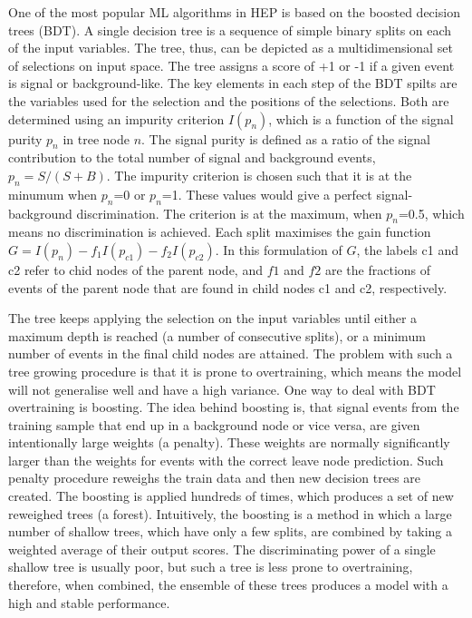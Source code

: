 One of the most popular ML algorithms in HEP is based on the boosted decision trees (BDT). A single decision tree is a sequence of simple binary splits on each of the input variables. The tree, thus, can be depicted as a multidimensional set of selections on input space. The tree assigns a score of +1 or -1 if a given event is signal or background-like. The key elements in each step of the BDT spilts are the variables used for the selection and the positions of the selections. Both are determined using an impurity criterion $I(p_n)$, which is a function of the signal purity $p_n$ in tree node $n$. The signal purity is defined as a ratio of the signal contribution to the total number of signal and background events, $p_n = S/(S+B)$. The impurity criterion is chosen such that it is at the minumum when $p_n$=0 or $p_n$=1. These values would give a perfect signal-background discrimination. The criterion is at the maximum, when $p_n$=0.5, which means no discrimination is achieved. 
Each split maximises the gain function $G=I(p_n) - f_1I(p_{c1})-f_2I(p_{c2})$. In this formulation of $G$, the labels c1 and c2 refer to chid nodes of the parent node, and $f1$ and $f2$ are the fractions of events of the parent node that are found in child nodes c1 and c2, respectively. 

The tree keeps applying the selection on the input variables until either a maximum depth is reached (a number of consecutive splits), or a minimum number of events in the final child nodes are attained. The problem with such a tree growing procedure is that it is prone to overtraining, which means the model will not generalise well and have a high variance. One way to deal with BDT overtraining is boosting. 
The idea behind boosting is, that signal events
 from the training sample that end up in a background node or vice versa, are given intentionally large weights (a penalty). These weights are normally significantly larger than the weights for events with
 the correct leave node prediction. Such penalty procedure reweighs the train data and then new decision trees are created. The boosting is applied hundreds of times, which produces a set of new reweighed trees (a forest). Intuitively, the boosting is a method in which a large number of shallow trees, which have only a few splits, are combined by taking a weighted average of their output scores. The discriminating power of a single shallow tree is usually poor, but such a tree is less prone to overtraining, therefore, when combined, the ensemble of these trees produces a model with a high and stable performance.
 
